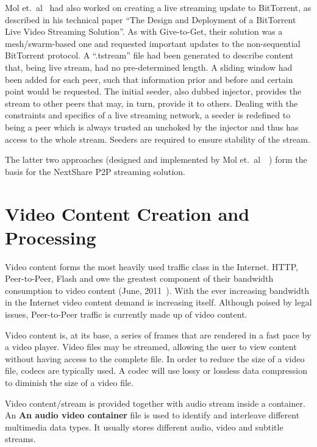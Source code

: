 Mol et.~al~ had also worked on creating a live streaming update to BitTorrent,
as described in his technical paper ``The Design and Deployment of a
BitTorrent Live Video Streaming Solution''. As with Give-to-Get, their
solution was a mesh/swarm-based one and requested important updates to the
non-sequential BitTorrent protocol. A ``.tstream'' file had been generated to
describe content that, being live stream, had no pre-determined length. A
sliding window had been added for each peer, such that information prior and
before and certain point would be requested. The initial seeder, also dubbed
injector, provides the stream to other peers that may, in turn, provide it to
others. Dealing with the constraints and specifics of a live streaming
network, a seeder is redefined to being a peer which is always trusted an
unchoked by the injector and thus has access to the whole stream. Seeders are
required to ensure stability of the stream.

The latter two approaches (designed and implemented by Mol
et.~al~\cite{give-to-get}~\cite{design-p2p-live}) form the
basis for the NextShare P2P streaming solution.

\section{Video Content Creation and Processing}
\label{sec:multimedia-dist:video}

Video content forms the most heavily used traffic class in the Internet. HTTP,
Peer-to-Peer, Flash and owe the greatest component of their bandwidth
consumption to video content (June, 2011~\cite{sandvine}). With the ever
increasing bandwidth in the Internet video content demand is increasing
itself. Although poised by legal issues, Peer-to-Peer traffic is currently
made up of video content.

Video content is, at its base, a series of frames that are rendered in a fast
pace by a video player. Video files may be streamed, allowing the user to view
content without having access to the complete file. In order to reduce the
size of a video file, codecs are typically used. A codec will use lossy or
lossless data compression to diminish the size of a video file.

Video content/stream is provided together with audio stream inside a
container. An \textbf{An audio video container} file is used to identify and
interleave different multimedia data types. It usually stores different audio,
video and subtitle streams.


